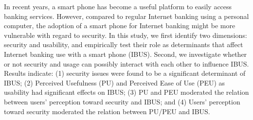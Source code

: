 In recent years, a smart phone has become a useful platform to easily access banking services. However, compared to regular Internet banking using a personal computer, the adoption of a smart phone for Internet banking might be more vulnerable with regard to security. In this study, we first identify two dimensions: security and usability, and empirically test their role as determinants that affect Internet banking use with a smart phone (IBUS). Second, we investigate whether or not security and usage can possibly interact with each other to influence IBUS. Results indicate: (1) security issues were found to be a significant determinant of IBUS; (2) Perceived Usefulness (PU) and Perceived Ease of Use (PEU) as usability had significant effects on IBUS; (3) PU and PEU moderated the relation between users' perception toward security and IBUS; and (4) Users' perception toward security moderated the relation between PU/PEU and IBUS.
